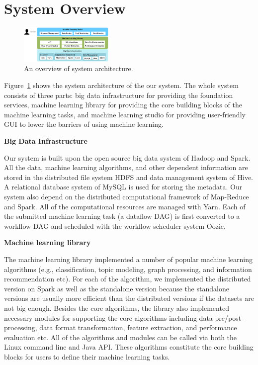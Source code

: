 \documentclass{sig-alternate-05-2015}
\begin{document}
\section{System Overview}

\begin{figure}
\centering
\includegraphics[width= 0.4\textwidth]{arch.eps}
\caption{ An overview of system architecture.}
\label{fig:arch}
\end{figure}

Figure~\ref{fig:arch} shows the system architecture of the our system. The whole system consists of three parts: big data infrastructure for providing the foundation services, machine learning library for providing the core building blocks of the machine learning tasks, and machine learning studio for providing user-friendly GUI to lower the barriers of using machine learning.

\noindent\textbf{Big Data Infrastructure}

Our system is built upon the open source big data system of Hadoop and Spark. All the data, machine learning algorithms, and other dependent information are stored in the distributed file system HDFS and data management system of Hive. A relational database system of MySQL is used for storing the metadata. Our system also depend on the distributed computational framework of Map-Reduce and Spark. All of the computational resources are managed with Yarn. Each of the submitted machine learning task (a dataflow DAG) is first converted to a workflow DAG and scheduled with the workflow scheduler system Oozie.

\noindent\textbf{Machine learning library}

The machine learning library implemented a number of popular machine learning algorithms (e.g., classification, topic modeling, graph processing, and information recommendation etc). For each of the algorithm, we implemented the distributed version on Spark as well as the standalone version because the standalone versions are usually more efficient than the distributed versions if the datasets are not big enough. Besides the core algorithms, the library also implemented necessary modules for supporting the core algorithms including data pre/post-processing, data format transformation, feature extraction, and performance evaluation etc. All of the algorithms and modules can be called via both the Linux command line and Java API. These algorithms constitute the core building blocks for users to define their machine learning tasks.
\end{document}
